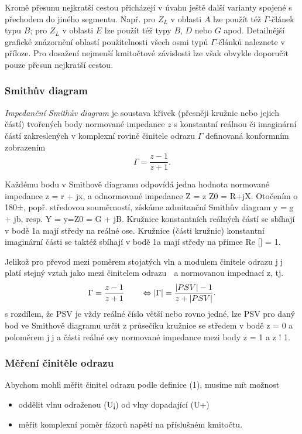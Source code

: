         Kromě přesunu nejkratší cestou přicházejí v úvahu ještě další varianty spojené s přechodem do jiného 
        segmentu. Např. pro \(Z_L\) v oblasti \(A\) lze použít též \(\Gamma\text{-článek}\) typu \(B\); pro 
        \(Z_L\) v oblasti \(E\) lze použít též typy \(B\), \(D\) nebo \(G\) apod. Detailnější grafické 
        znázornění oblastí použitelnosti všech osmi typů \(\Gamma\text{-článků}\) naleznete v příloze. Pro 
        dosažení nejmenší kmitočtové závislosti lze však obvykle doporučit pouze přesun nejkratší cestou.
  
      \subsubsection{Smithův diagram}
        \emph{Impedanční Smithův diagram} je soustava křivek (přesněji kružnic nebo jejich částí) tvořených 
        body normované impedance \(z\) s konstantní reálnou či imaginární částí zakreslených v komplexní 
        rovině činitele odrazu \(\Gamma\) definovaná konformním zobrazením
        \begin{equation}\label{RA:eq_smith07}
          \Gamma = \frac{z-1}{z+1}.
        \end{equation} 
  
        Každému bodu v Smithově diagramu odpovídá jedna hodnota normované impedance z = r + jx, a odnormované 
        impedance Z = z Z0 = R+jX. Otočením o 180±, popř. středovou souměrností, získáme admitanční Smithův 
        diagram y = g + jb, resp. Y = y=Z0 = G + jB. Kružnice konstantních reálných částí se sbíhají v bodě 
        1a mají středy na reálné ose. Kružnice (části kružnic) konstantní imaginární části se taktéž sbíhají 
        v bodě 1a mají středy na přímce Re [] = 1.
  
        Jelikož pro převod mezi poměrem stojatých vln a modulem činitele odrazu j􀀀j platí stejný vztah jako 
        mezi činitelem odrazu 􀀀 a normovanou impednací z, tj.
        \begin{equation}\label{RA:eq_smith08}
          \Gamma = \frac{z-1}{z+1} \qquad \Leftrightarrow 
          \left\lvert\Gamma\right\rvert = \frac{\left\lvert PSV\right\rvert-1}{z+\left\lvert PSV\right\rvert}.
        \end{equation} 
        s rozdílem, že PSV je vždy reálné číslo větší nebo rovno jedné, lze PSV pro daný bod ve Smithově 
        diagramu určit z průsečíku kružnice se středem v bodě z = 0 a poloměrem j􀀀j a části reálné osy 
        normované impedance mezi body z = 1 a z ! 1.
        
      \subsubsection{Měření činitěle odrazu} 
        Abychom mohli měřit činitel odrazu podle definice (1), musíme mít možnost
        \begin{itemize}
          \item oddělit vlnu odraženou (U¡) od vlny dopadající (U+)
          \item měřit komplexní poměr fázorů napětí na příslušném kmitočtu.
        \end{itemize} 
        
